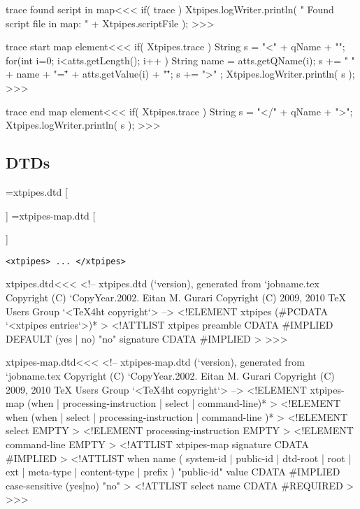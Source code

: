 \documentclass{article}
\begin{document}
{\<trace found script in map\><<<
if( trace ){
   Xtpipes.logWriter.println( " Found script file in map: "
                                + Xtpipes.scriptFile );
}
>>>


\<trace start map element\><<<
if( Xtpipes.trace ){
   String s =  "<" + qName + "\n";
   for(int i=0; i<atts.getLength(); i++ ){
      String name = atts.getQName(i);
      s += " " + name + "=\"" + atts.getValue(i) + "\"";
   }
   s += ">" ;
   Xtpipes.logWriter.println( s );
}
>>>

\<trace end map element\><<<
if( Xtpipes.trace ){
   String s =  "</" + qName + ">";
   Xtpipes.logWriter.println( s );
}
>>>



\subsection{DTDs}



\immediate{}=xtpipes.dtd
 \else
   \immediate{}
   [
     
   \EndHPage{}]
\fi
%
\immediate{}=xtpipes-map.dtd
 \else
   \immediate{}
   [
     
   \EndHPage{}]
\fi

\begin{verbatim}
<xtpipes> ... </xtpipes>
\end{verbatim}

\<xtpipes.dtd\><<<
<!-- xtpipes.dtd (`version), generated from `jobname.tex
     Copyright (C) `CopyYear.2002. Eitan M. Gurari
     Copyright (C) 2009, 2010 TeX Users Group
`<TeX4ht copyright`> -->
<!ELEMENT xtpipes (#PCDATA `<xtpipes entries`>)* >
<!ATTLIST xtpipes
          preamble  CDATA #IMPLIED DEFAULT (yes | no) "no"
          signature CDATA #IMPLIED                         >
>>>


% 

\expandafter\AddFile{}

\<xtpipes-map.dtd\><<<
<!-- xtpipes-map.dtd (`version), generated from `jobname.tex
     Copyright (C) `CopyYear.2002. Eitan M. Gurari
     Copyright (C) 2009, 2010 TeX Users Group
`<TeX4ht copyright`> -->
<!ELEMENT xtpipes-map (when | processing-instruction
                            | select
                            | command-line)*  >
<!ELEMENT when (when | select
                     | processing-instruction
                     | command-line )*  >
<!ELEMENT select EMPTY >
<!ELEMENT processing-instruction EMPTY >
<!ELEMENT command-line EMPTY >
<!ATTLIST xtpipes-map
          signature      CDATA #IMPLIED
>
<!ATTLIST when
          name   (
                    system-id
                  | public-id
                  | dtd-root
                  | root
                  | ext
                  | meta-type
                  | content-type
                  | prefix      )  "public-id"
          value   CDATA #IMPLIED
          case-sensitive (yes|no) "no"
>
<!ATTLIST select
          name      CDATA #REQUIRED
>
>>>


}
\end{document}

